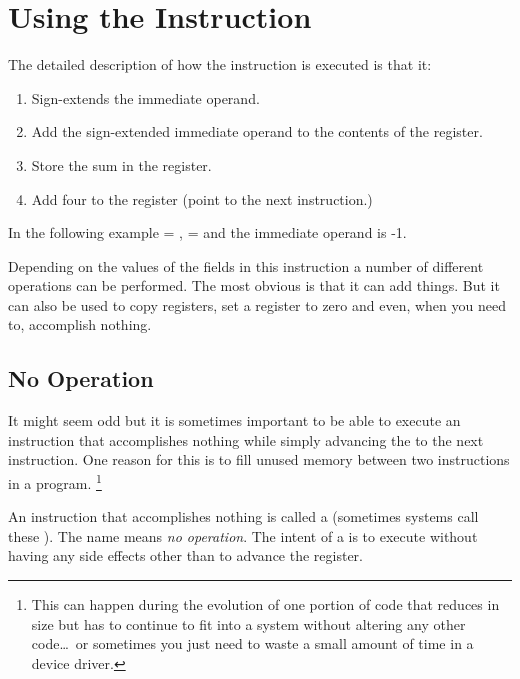 \section{Using the  Instruction}
\label{insn:addi}

%
The detailed description of how the  instruction is executed
is that it:
\begin{enumerate}
\item Sign-extends the immediate operand.
\item Add the sign-extended immediate operand to the contents of the  register.
\item Store the sum in the  register.
\item Add four to the  register (point to the next instruction.)
\end{enumerate}

In the following example  = ,  =  and
the immediate operand is -1.


Depending on the values of the fields in this instruction a number of
different operations can be performed.  The most obvious is that it
can add things.  But it can also be used to copy registers, set a 
register to zero and even, when you need to, accomplish nothing.

\subsection{No Operation}

It might seem odd but it is sometimes important to be able to execute
an instruction that accomplishes nothing while simply advancing the 
 to the next instruction.  One reason for this is to fill 
unused memory between two instructions in a program.%
\footnote{This can happen during the evolution of one portion of code 
that reduces in size but has to continue to fit into a system without 
altering any other code\ldots\ or sometimes you just need to waste 
a small amount of time in a device driver.}

An instruction that accomplishes nothing is called a 
(sometimes systems call these ).  The name means 
{\em no operation}.  
The intent of a  is to execute without having any side effects 
other than to advance the  register.

